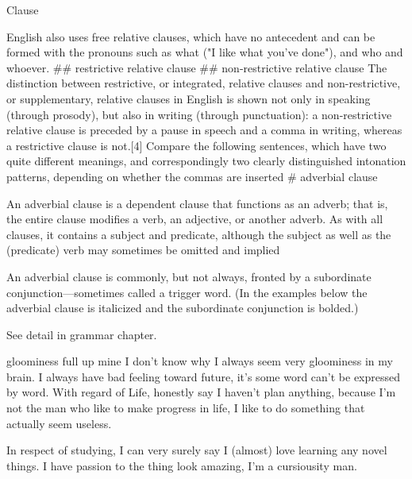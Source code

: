 \begin{writing}[18-8-24]{Clause}
\begin{easylist}[checklist]
{    English also uses free relative clauses, which have no antecedent and can be formed 
    with the pronouns such as what ("I like what you've done"), and who and whoever.
    }
## restrictive relative clause
## non-restrictive relative clause\newline
    {\color{gray}
    The distinction between restrictive, or integrated, relative clauses and non-restrictive, 
    or supplementary, relative clauses in English is shown not only in speaking (through 
    prosody), but also in writing (through punctuation): a non-restrictive relative 
    clause is preceded by a pause in speech and a comma in writing, whereas 
    a restrictive clause is not.[4] Compare the following sentences, which have 
    two quite different meanings, and correspondingly two clearly distinguished intonation patterns, depending on 
    whether the commas are inserted}
# adverbial clause\newline
    {\color{gray}
    An adverbial clause is a dependent clause that functions as an adverb; that is,
    the entire clause modifies a verb, an adjective, or another adverb. 
    As with all clauses, it contains a subject and predicate, although the subject 
    as well as the (predicate) verb may sometimes be omitted and implied 

    An adverbial clause is commonly, but not always, fronted by a subordinate conjunction—sometimes 
    called a trigger word. (In the examples below the adverbial clause is italicized 
    and the subordinate conjunction is bolded.)
    }
\end{easylist}
See detail in grammar chapter.
\end{writing}

\begin{writing}[18-8-28]{gloominess full up mine}
    I don't know why I always seem very  gloominess in my brain.
    I always have bad feeling toward future, it's some word can't be expressed by word.
    With regard of Life, honestly say I haven't plan anything, because I'm not the man
    who like to make progress in life, I like to do something that actually seem useless.

    In respect of studying, I can very surely say I (almost) love learning any novel things.
    I have passion to the thing look amazing, I'm a cursiousity man.
\end{writing}